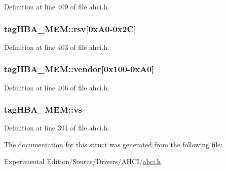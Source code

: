 Definition at line 409 of file ahci.\+h.

\subsubsection[{\texorpdfstring{rsv}{rsv}}]{ tag\+H\+B\+A\+\_\+\+M\+E\+M\+::rsv\mbox{[}0x\+A0-\/0x2\+C\mbox{]}}\hypertarget{structtagHBA__MEM_ad2e9bac8871df4331a830a4f3869affa}{}\label{structtagHBA__MEM_ad2e9bac8871df4331a830a4f3869affa}


Definition at line 403 of file ahci.\+h.

\subsubsection[{\texorpdfstring{vendor}{vendor}}]{ tag\+H\+B\+A\+\_\+\+M\+E\+M\+::vendor\mbox{[}0x100-\/0x\+A0\mbox{]}}\hypertarget{structtagHBA__MEM_a3869422a65c7777a6f5e013df134cf8a}{}\label{structtagHBA__MEM_a3869422a65c7777a6f5e013df134cf8a}


Definition at line 406 of file ahci.\+h.

\subsubsection[{\texorpdfstring{vs}{vs}}]{ tag\+H\+B\+A\+\_\+\+M\+E\+M\+::vs}\hypertarget{structtagHBA__MEM_a733df04d8b6b74306fae06a578524c4b}{}\label{structtagHBA__MEM_a733df04d8b6b74306fae06a578524c4b}


Definition at line 394 of file ahci.\+h.



The documentation for this struct was generated from the following file\+:\begin{DoxyCompactItemize}
\item 
Experimental Edition/\+Source/\+Drivers/\+A\+H\+C\+I/\hyperlink{ahci_8h}{ahci.\+h}\end{DoxyCompactItemize}
